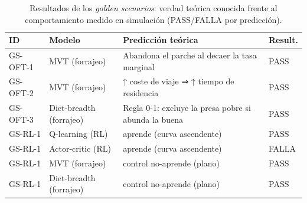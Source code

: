 \begin{table}[H]
\begin{center}
\small
\begin{tabular}{|>{\raggedright\arraybackslash}p{1.5cm}|>{\raggedright\arraybackslash}p{3.0cm}|>{\raggedright\arraybackslash}p{4.6cm}|>{\raggedright\arraybackslash}p{1.4cm}|} \hline
\textbf{ID} & \textbf{Modelo} & \textbf{Predicción teórica} & \textbf{Result.} \\ \hline
GS-OFT-1 & MVT (forrajeo) & Abandona el parche al decaer la tasa marginal & PASS \\ \hline
GS-OFT-2 & MVT (forrajeo) & ↑ coste de viaje ⇒ ↑ tiempo de residencia & PASS \\ \hline
GS-OFT-3 & Diet-breadth (forrajeo) & Regla 0-1: excluye la presa pobre si abunda la buena & PASS \\ \hline
GS-RL-1 & Q-learning (RL) & aprende (curva ascendente) & PASS \\ \hline
GS-RL-1 & Actor-critic (RL) & aprende (curva ascendente) & FALLA \\ \hline
GS-RL-1 & MVT (forrajeo) & control no-aprende (plano) & PASS \\ \hline
GS-RL-1 & Diet-breadth (forrajeo) & control no-aprende (plano) & PASS \\ \hline
\end{tabular}
\caption{Resultados de los \textit{golden scenarios}: verdad teórica conocida frente al comportamiento medido en simulación (PASS/FALLA por predicción).}
\label{tab:gs-resultados}
\end{center}
\end{table}
